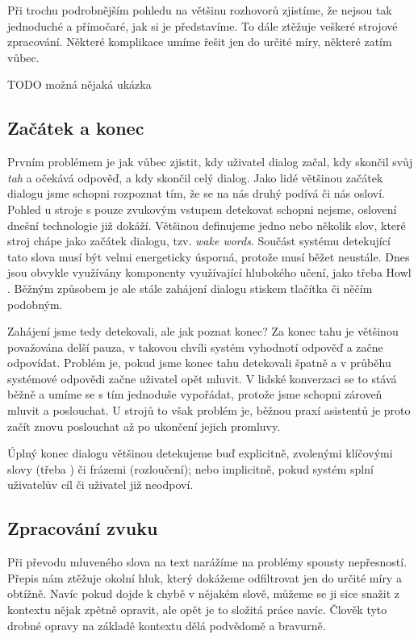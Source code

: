 Při trochu podrobnějším pohledu na většinu rozhovorů zjistíme, že nejsou
tak jednoduché a přímočaré, jak si je představíme. To dále ztěžuje
veškeré strojové zpracování. Některé komplikace umíme řešit jen do určité
míry, některé zatím vůbec.

TODO možná nějaká ukázka

\subsection{Začátek a konec}

Prvním problémem je jak vůbec zjistit, kdy uživatel dialog začal, kdy
skončil svůj \textit{tah} a očekává odpověď, a kdy skončil celý dialog.
Jako lidé většinou začátek dialogu jsme schopni rozpoznat tím, že se na
nás druhý podívá či nás osloví. Pohled u stroje s pouze zvukovým vstupem
detekovat schopni nejsme, oslovení dnešní technologie již dokáží. Většinou
definujeme jedno nebo několik slov, které stroj chápe jako začátek dialogu,
tzv. \textit{wake words}. Součást systému detekující tato slova musí být velmi
energeticky úsporná, protože musí běžet neustále. Dnes jsou obvykle
využívány komponenty využívající hlubokého učení, jako třeba Howl
\citep{tang_howl_2020}.
Běžným způsobem je ale stále zahájení dialogu stiskem tlačítka či něčím
podobným.

Zahájení jsme tedy detekovali, ale jak poznat konec? Za konec tahu je
většinou považována delší pauza, v takovou chvíli systém vyhodnotí odpověď
a začne odpovídat. Problém je, pokud jsme konec tahu detekovali špatně a
v průběhu systémové odpovědi začne uživatel opět mluvit. V lidské konverzaci
se to stává běžně a umíme se s tím jednoduše vypořádat, protože jsme schopni
zároveň mluvit a poslouchat. U strojů to však problém je, běžnou praxí asistentů
je proto začít znovu poslouchat až po ukončení jejich promluvy.

Úplný konec dialogu většinou detekujeme buď explicitně, zvolenými klíčovými
slovy (třeba ) či frázemi (rozloučení); nebo implicitně, pokud
systém splní uživatelův cíl či uživatel již neodpoví.

\subsection{Zpracování zvuku}

Při převodu mluveného slova na text narážíme na problémy spousty nepřesností.
Přepis nám ztěžuje okolní hluk, který dokážeme odfiltrovat jen do určité míry
a obtížně. Navíc pokud dojde k chybě v nějakém slově, můžeme se ji sice snažit
z kontextu nějak zpětně opravit, ale opět je to složitá práce navíc. Člověk
tyto drobné opravy na základě kontextu dělá podvědomě a bravurně.

